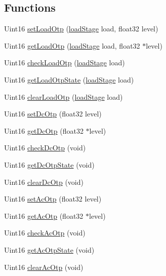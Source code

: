 \subsection*{Functions}
\begin{DoxyCompactItemize}
\item 
Uint16 \hyperlink{a00034_af106c65ecd7a27b0af61e108d09e330f}{set\-Load\-Otp} (\hyperlink{a00027_a2820f1e18d921d2f1e97d53404b9fbae}{load\-Stage} load, float32 level)
\item 
Uint16 \hyperlink{a00034_a0f019d8375281a322e2b136f367d9f73}{get\-Load\-Otp} (\hyperlink{a00027_a2820f1e18d921d2f1e97d53404b9fbae}{load\-Stage} load, float32 $\ast$level)
\item 
Uint16 \hyperlink{a00034_ac41af2b33ac4b5ac6552ed797a71b25d}{check\-Load\-Otp} (\hyperlink{a00027_a2820f1e18d921d2f1e97d53404b9fbae}{load\-Stage} load)
\item 
Uint16 \hyperlink{a00034_ac26e4a57e49a8a0dbb58aa993a26e6c3}{get\-Load\-Otp\-State} (\hyperlink{a00027_a2820f1e18d921d2f1e97d53404b9fbae}{load\-Stage} load)
\item 
Uint16 \hyperlink{a00034_a8c4197a002661d8a8fc0ee4367c98caa}{clear\-Load\-Otp} (\hyperlink{a00027_a2820f1e18d921d2f1e97d53404b9fbae}{load\-Stage} load)
\item 
Uint16 \hyperlink{a00034_a99d17f52bec6b23581f05149a21b8d7a}{set\-Dc\-Otp} (float32 level)
\item 
Uint16 \hyperlink{a00034_ade095cc31020c7d4afeebe83ca8e52ea}{get\-Dc\-Otp} (float32 $\ast$level)
\item 
Uint16 \hyperlink{a00034_a66c1d5f4705adf4b8947c6760d6c3e88}{check\-Dc\-Otp} (void)
\item 
Uint16 \hyperlink{a00034_a8f738c9c764f982075747c4561937580}{get\-Dc\-Otp\-State} (void)
\item 
Uint16 \hyperlink{a00034_a1058c22a8c169984c8c615fec65064a4}{clear\-Dc\-Otp} (void)
\item 
Uint16 \hyperlink{a00034_a15a820aa2efc9b533c12b1a444f031fb}{set\-Ac\-Otp} (float32 level)
\item 
Uint16 \hyperlink{a00034_ab590c612ea9a7827859e0c100623e338}{get\-Ac\-Otp} (float32 $\ast$level)
\item 
Uint16 \hyperlink{a00034_aa88957137245403b79608032a773d6fe}{check\-Ac\-Otp} (void)
\item 
Uint16 \hyperlink{a00034_a17dc5aa8abd3776b8bea4283e69cfb93}{get\-Ac\-Otp\-State} (void)
\item 
Uint16 \hyperlink{a00034_ad65b5cbf773b35ebd01a88885a8f7ece}{clear\-Ac\-Otp} (void)

\end{DoxyCompactItemize}
